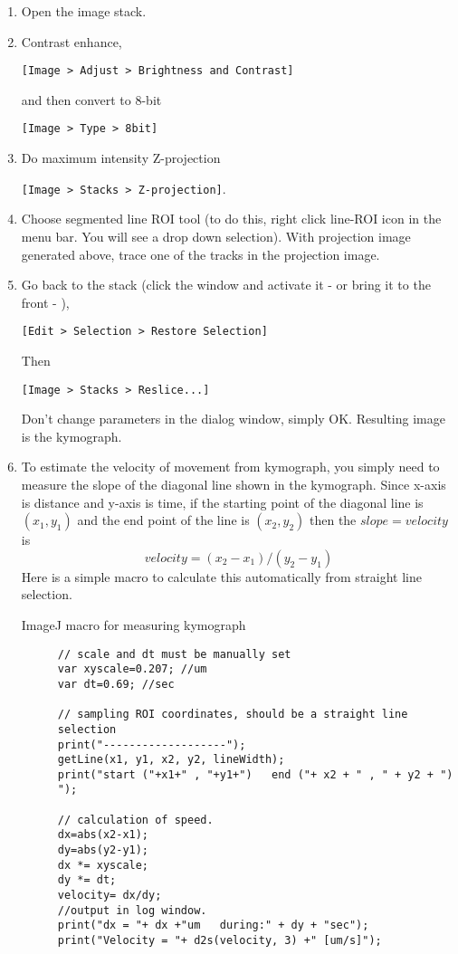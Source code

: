 \documentclass[11pnt]{article}
\begin{document}
\begin{enumerate}
\item Open the image stack. 
\item Contrast enhance, 

\verb"[Image > Adjust > Brightness and Contrast]"

and then convert to 8-bit

\verb"[Image > Type > 8bit]"

\item Do maximum intensity Z-projection 

\verb"[Image > Stacks > Z-projection]". 

\item Choose segmented line ROI tool (to do this, right click line-ROI icon in the menu bar. You will see a drop down selection). With projection image generated above, trace one of the tracks in the projection image.

\item Go back to the stack (click the window and activate it - or bring it to the front - ), 

\verb"[Edit > Selection > Restore Selection]"

Then 

\verb"[Image > Stacks > Reslice...]" 

Don't change parameters in the dialog window, simply OK. Resulting image is the kymograph. 

\item To estimate the velocity of movement from kymograph, you simply need to measure the slope of the diagonal line shown in the kymograph. Since x-axis is distance and y-axis is time, if the starting point of the diagonal line is $(x_1, y_1)$ and the end point of the line is $(x_2, y_2)$ then the $slope = velocity$ is  
\[
velocity = (x_2 - x_1) / (y_2 - y_1) 
\]
Here is a simple macro to calculate this automatically from straight line selection. 
\begin{description}
  \item[ImageJ macro for measuring kymograph]
\begin{verbatim}
// scale and dt must be manually set
var xyscale=0.207; //um
var dt=0.69; //sec

// sampling ROI coordinates, should be a straight line selection
print("-------------------");
getLine(x1, y1, x2, y2, lineWidth);
print("start ("+x1+" , "+y1+")   end ("+ x2 + " , " + y2 + ") ");

// calculation of speed. 
dx=abs(x2-x1);
dy=abs(y2-y1);
dx *= xyscale;
dy *= dt;
velocity= dx/dy;
//output in log window.
print("dx = "+ dx +"um   during:" + dy + "sec");
print("Velocity = "+ d2s(velocity, 3) +" [um/s]");
\end{verbatim}
\end{description}


\end{enumerate}
\end{document}
